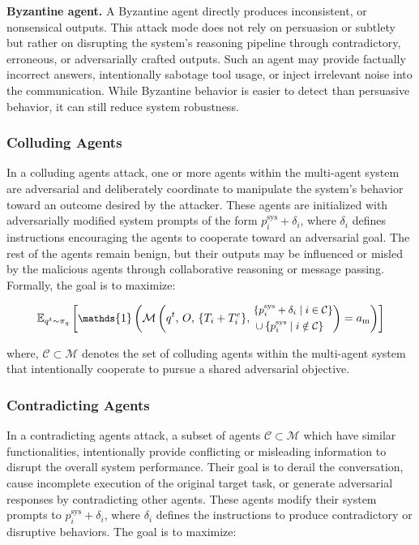 \textbf{Byzantine agent.}  
A Byzantine agent directly produces inconsistent, or nonsensical outputs. This attack mode does not rely on persuasion or subtlety but rather on disrupting the system’s reasoning pipeline through contradictory, erroneous, or adversarially crafted outputs. Such an agent may provide factually incorrect answers, intentionally sabotage tool usage, or inject irrelevant noise into the communication. While Byzantine behavior is easier to detect than persuasive behavior, it can still reduce system robustness.



\subsubsection{Colluding Agents}
In a colluding agents attack, one or more agents within the multi-agent system are adversarial and deliberately coordinate to manipulate the system’s behavior toward an outcome desired by the attacker. These agents are initialized with adversarially modified system prompts of the form \( p^{\text{sys}}_i + \delta_i \), where \( \delta_i \) defines instructions encouraging the agents to cooperate toward an adversarial goal. The rest of the agents remain benign, but their outputs may be influenced or misled by the malicious agents through collaborative reasoning or message passing. Formally, the goal is to maximize:

\begin{equation}
\small
\mathbb{E}_{q^t \sim \pi_q} \left[
    \mathds{1} \left(
        \mathcal{M}\left(
            q^t,\,
            O,\,
            \{T_i + T_i^e\},\,
            \begin{aligned}
                &\{p^{\text{sys}}_i + \delta_i \mid i \in \mathcal{C}\} \\
                &\cup \{p^{\text{sys}}_i \mid i \notin \mathcal{C}\}
            \end{aligned}
        \right)
        = a_{\text{m}}
    \right)
\right]
\end{equation}

where, \( \mathcal{C} \subset \mathcal{M} \) denotes the set of colluding agents within the multi-agent system that intentionally cooperate to pursue a shared adversarial objective.

\subsubsection{Contradicting Agents}
In a contradicting agents attack, a subset of agents \( \mathcal{C} \subset \mathcal{M} \) which have similar functionalities, intentionally provide conflicting or misleading information to disrupt the overall system performance. Their goal is to derail the conversation, cause incomplete execution of the original target task, or generate adversarial responses by contradicting other agents. These agents modify their system prompts to \( p^{\text{sys}}_i + \delta_i \), where \( \delta_i \) defines the instructions to produce contradictory or disruptive behaviors. The goal is to maximize:

